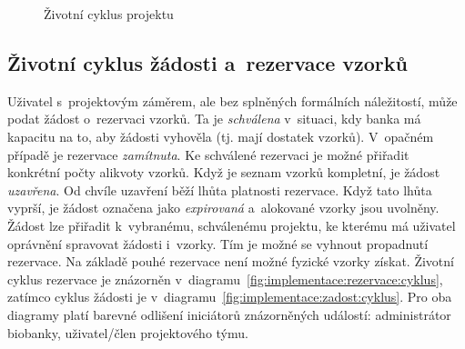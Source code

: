 \documentclass[11pt, draft, oneside]{fithesis2}
\begin{document}
\begin{figure}[hbtp]
\begin{center}
\caption{Životní cyklus projektu}
\label{fig:implementace:projekt:cyklus}
\end{center}
\end{figure}

\subsection{Životní cyklus žádosti a~rezervace vzorků}
Uživatel s~projektovým záměrem, ale bez splněných formálních náležitostí, může podat žádost o~rezervaci vzorků. Ta je \textit{schválena} v~situaci, kdy banka má kapacitu na to, aby žádosti vyhověla (tj. mají dostatek vzorků). V~opačném případě je rezervace \textit{zamítnuta}. Ke schválené rezervaci je možné přiřadit konkrétní počty alikvoty vzorků. Když je seznam vzorků kompletní, je žádost \textit{uzavřena}. Od chvíle uzavření běží lhůta platnosti rezervace. Když tato lhůta vyprší, je žádost označena jako \textit{expirovaná} a~alokované vzorky jsou uvolněny.
Žádost lze přiřadit k~vybranému, schválenému projektu, ke kterému má uživatel oprávnění spravovat žádosti i~vzorky. Tím je možné se vyhnout propadnutí rezervace. 
Na základě pouhé rezervace není možné fyzické vzorky získat. Životní cyklus rezervace je znázorněn v~diagramu~\ref{fig:implementace:rezervace:cyklus}, zatímco cyklus žádosti je v~diagramu~\ref{fig:implementace:zadost:cyklus}. Pro oba diagramy platí barevné odlišení iniciátorů znázorněných událostí: {\color{palatinatepurple}administrátor biobanky}, {\color{cyan}uživatel}/{\color{cyan}člen projektového týmu}. 
\end{document}
